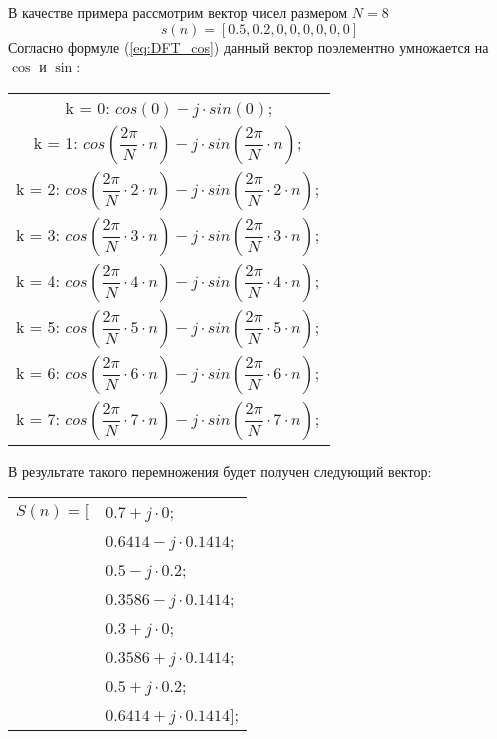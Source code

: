 В качестве примера рассмотрим вектор чисел размером \(N = 8 \)
\begin{equation*}
    s(n) = [0.5, 0.2, 0, 0, 0, 0, 0, 0]
\end{equation*}
Согласно формуле (\ref{eq:DFT_cos}) данный вектор поэлементно умножается на \(\cos\) и \(\sin\):
\begin{table}[H]
    \centering
    \begin{tabular}{c}
        k = 0: \(cos(0) - j \cdot sin(0)\); \\
        k = 1: \(cos(\dfrac{2\pi}{N} \cdot n) - j \cdot sin(\dfrac{2\pi}{N} \cdot n);\) \\
        k = 2: \(cos(\dfrac{2\pi}{N} \cdot 2 \cdot n) - j \cdot sin(\dfrac{2\pi}{N} \cdot 2 \cdot n);\)  \\
        k = 3: \(cos(\dfrac{2\pi}{N} \cdot 3 \cdot n) - j \cdot sin(\dfrac{2\pi}{N} \cdot 3 \cdot  n);\) \\
        k = 4: \(cos(\dfrac{2\pi}{N} \cdot 4 \cdot n) - j \cdot sin(\dfrac{2\pi}{N} \cdot 4 \cdot n);\)  \\
        k = 5: \(cos(\dfrac{2\pi}{N} \cdot 5 \cdot n) - j \cdot sin(\dfrac{2\pi}{N} \cdot 5 \cdot n);\) \\
        k = 6: \(cos(\dfrac{2\pi}{N} \cdot 6 \cdot n) - j \cdot sin(\dfrac{2\pi}{N} \cdot 6 \cdot n);\)  \\
        k = 7: \(cos(\dfrac{2\pi}{N} \cdot 7 \cdot n) - j \cdot sin(\dfrac{2\pi}{N} \cdot 7 \cdot n);\) \\
    \end{tabular}
\end{table}
В результате такого перемножения будет получен следующий вектор:
\begin{table}[H]
    \centering
    \begin{tabular}{ll}
        \(S(n) = [\) & 
        \(0.7 + j \cdot 0\); \\
        & \(0.6414 - j \cdot 0.1414\); \\
        & \(0.5 - j \cdot 0.2\); \\
        & \(0.3586 - j \cdot 0.1414\); \\
        & \(0.3 + j \cdot 0\); \\
        & \(0.3586 + j \cdot 0.1414\); \\
        & \(0.5 + j \cdot 0.2\); \\
        & \(0.6414 + j \cdot 0.1414]\); \\
    \end{tabular}
\end{table}